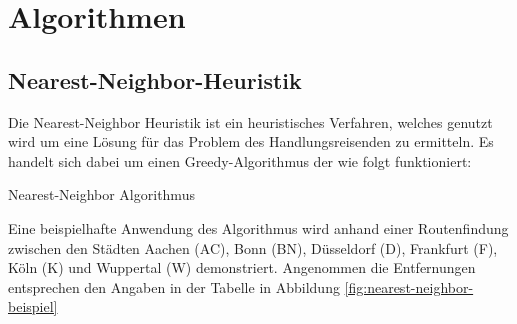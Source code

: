 \documentclass{article}
\begin{document}
%
%
%
\section{Algorithmen}

\subsection{Nearest-Neighbor-Heuristik}

Die Nearest-Neighbor Heuristik ist ein heuristisches Verfahren, welches genutzt wird um eine Lösung für das Problem des Handlungsreisenden zu ermitteln. Es handelt sich dabei um einen Greedy-Algorithmus der wie folgt funktioniert:

\begin{algorithm}
\caption{Nearest-Neighbor Algorithmus}
\end{algorithm}

Eine beispielhafte Anwendung des Algorithmus wird anhand einer Routenfindung zwischen den Städten Aachen (AC), Bonn (BN), Düsseldorf (D), Frankfurt (F), Köln (K) und Wuppertal (W) demonstriert. Angenommen die Entfernungen entsprechen den Angaben in der Tabelle in Abbildung \ref{fig:nearest-neighbor-beispiel}

\end{document}
